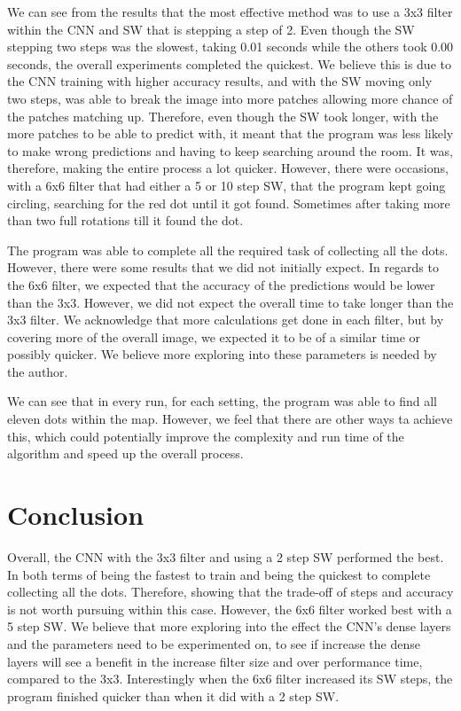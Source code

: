 \documentclass[a4paper,10pt]{article}
\begin{document}
We can see from the results that the most effective method was to use a 3x3 filter within the CNN and SW that is stepping a step of 2. Even though the SW stepping two steps was the slowest, taking 0.01 seconds while the others took 0.00 seconds, the overall experiments completed the quickest. We believe this is due to the CNN training with higher accuracy results, and with the SW moving only two steps, was able to break the image into more patches allowing more chance of the patches matching up. Therefore, even though the SW took longer, with the more patches to be able to predict with, it meant that the program was less likely to make wrong predictions and having to keep searching around the room. It was, therefore, making the entire process a lot quicker. However, there were occasions, with a 6x6 filter that had either a 5 or 10 step SW, that the program kept going circling, searching for the red dot until it got found. Sometimes after taking more than two full rotations till it found the dot.

The program was able to complete all the required task of collecting all the dots. However, there were some results that we did not initially expect. In regards to the 6x6 filter, we expected that the accuracy of the predictions would be lower than the 3x3. However, we did not expect the overall time to take longer than the 3x3 filter. We acknowledge that more calculations get done in each filter, but by covering more of the overall image, we expected it to be of a similar time or possibly quicker. We believe more exploring into these parameters is needed by the author.

We can see that in every run, for each setting, the program was able to find all eleven dots within the map. However, we feel that there are other ways ta achieve this, which could potentially improve the complexity and run time of the algorithm and speed up the overall process. 

\section{Conclusion}

Overall, the CNN with the 3x3 filter and using a 2 step SW performed the best. In both terms of being the fastest to train and being the quickest to complete collecting all the dots. Therefore, showing that the trade-off of steps and accuracy is not worth pursuing within this case. However, the 6x6 filter worked best with a 5 step SW. We believe that more exploring into the effect the CNN's dense layers and the parameters need to be experimented on, to see if increase the dense layers will see a benefit in the increase filter size and over performance time, compared to the 3x3. Interestingly when the 6x6 filter increased its SW steps, the program finished quicker than when it did with a 2 step SW. 
\end{document}
